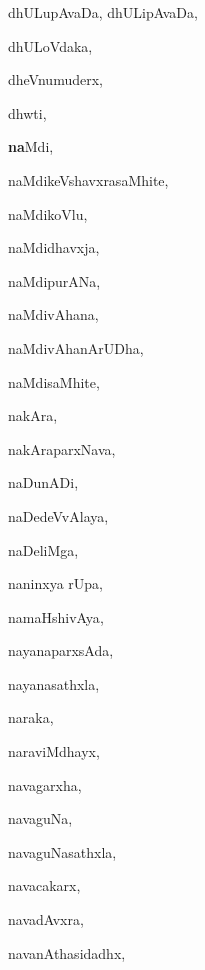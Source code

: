 \begin{multicols}{3}
{\noindent
{dhULupAvaDa, dhULipAvaDa}, \pageref{dhULupAvaDa, dhULipAvaDa}

\noindent
{dhULoVdaka}, \pageref{dhULoVdaka}

\noindent
{dheVnumuderx}, \pageref{dheVnumuderx}

\noindent
{dhwti}, \pageref{dhwti}


\noindent
{{\large\textbf{na}}Mdi}, \pageref{naMdi}

\noindent
{naMdikeVshavxrasaMhite}, \pageref{naMdikeVshavxrasaMhite}

\noindent
{naMdikoVlu}, \pageref{naMdikoVlu}

\noindent
{naMdidhavxja}, \pageref{naMdidhavxja}

\noindent
{naMdipurANa}, \pageref{naMdipurANa}

\noindent
{naMdivAhana}, \pageref{naMdivAhana}

\noindent
{naMdivAhanArUDha}, \pageref{naMdivAhanArUDha}

\noindent
{naMdisaMhite}, \pageref{naMdisaMhite}

\noindent
{nakAra}, \pageref{nakAra}

\noindent
{nakAraparxNava}, \pageref{nakAraparxNava}

\noindent
{naDunADi}, \pageref{naDunADi}

\noindent
{naDedeVvAlaya}, \pageref{naDedeVvAlaya}

\noindent
{naDeliMga}, \pageref{naDeliMga}

\noindent
{naninxya rUpa}, \pageref{naninxya rUpa}

\noindent
{namaHshivAya}, \pageref{namaHshivAya}

\noindent
{nayanaparxsAda}, \pageref{nayanaparxsAda}

\noindent
{nayanasathxla}, \pageref{nayanasathxla}

\noindent
{naraka}, \pageref{naraka}

\noindent
{naraviMdhayx}, \pageref{naraviMdhayx}

\noindent
{navagarxha}, \pageref{navagarxha}

\noindent
{navaguNa}, \pageref{navaguNa}

\noindent
{navaguNasathxla}, \pageref{navaguNasathxla}

\noindent
{navacakarx}, \pageref{navacakarx}

\noindent
{navadAvxra}, \pageref{navadAvxra}

\noindent
{navanAthasidadhx}, \pageref{navanAthasidadhx}

}
\end{multicols}

